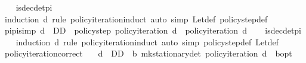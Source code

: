 \begin{isabellebody}
%
\isadelimproof
\ \ %
\endisadelimproof
%
\isatagproof
{}\isamarkupfalse%
\ is{\isacharunderscore}{\kern0pt}dec{\isacharunderscore}{\kern0pt}det{\isacharunderscore}{\kern0pt}pi\isanewline
\ \ \isamarkupfalse%
\ {\isacharparenleft}{\kern0pt}induction\ d\ rule{\isacharcolon}{\kern0pt}\ policy{\isacharunderscore}{\kern0pt}iteration{\isachardot}{\kern0pt}induct{\isacharparenright}{\kern0pt}\ {\isacharparenleft}{\kern0pt}auto\ simp{\isacharcolon}{\kern0pt}\ Let{\isacharunderscore}{\kern0pt}def\ policy{\isacharunderscore}{\kern0pt}step{\isacharunderscore}{\kern0pt}def{\isacharparenright}{\kern0pt}%
\endisatagproof
{\isafoldproof}%
%
\isadelimproof
\isanewline
%
\endisadelimproof
\isanewline
{}\isamarkupfalse%
\ pi{\isacharunderscore}{\kern0pt}pi{\isacharbrackleft}{\kern0pt}simp{\isacharbrackright}{\kern0pt}{\isacharcolon}{\kern0pt}\ {\isachardoublequoteopen}d\ {\isasymin}\ D\isactrlsub D\ {\isasymLongrightarrow}\ policy{\isacharunderscore}{\kern0pt}step\ {\isacharparenleft}{\kern0pt}policy{\isacharunderscore}{\kern0pt}iteration\ d{\isacharparenright}{\kern0pt}\ {\isacharequal}{\kern0pt}\ policy{\isacharunderscore}{\kern0pt}iteration\ d{\isachardoublequoteclose}\isanewline
%
\isadelimproof
\ \ %
\endisadelimproof
%
\isatagproof
{}\isamarkupfalse%
\ is{\isacharunderscore}{\kern0pt}dec{\isacharunderscore}{\kern0pt}det{\isacharunderscore}{\kern0pt}pi\isanewline
\ \ \isamarkupfalse%
\ {\isacharparenleft}{\kern0pt}induction\ d\ rule{\isacharcolon}{\kern0pt}\ policy{\isacharunderscore}{\kern0pt}iteration{\isachardot}{\kern0pt}induct{\isacharparenright}{\kern0pt}\ {\isacharparenleft}{\kern0pt}auto\ simp{\isacharcolon}{\kern0pt}\ policy{\isacharunderscore}{\kern0pt}step{\isacharunderscore}{\kern0pt}def\ Let{\isacharunderscore}{\kern0pt}def{\isacharparenright}{\kern0pt}%
\endisatagproof
{\isafoldproof}%
%
\isadelimproof
\isanewline
%
\endisadelimproof
\isanewline
{}\isamarkupfalse%
\ policy{\isacharunderscore}{\kern0pt}iteration{\isacharunderscore}{\kern0pt}correct{\isacharcolon}{\kern0pt}\ \isanewline
\ \ {\isachardoublequoteopen}d\ {\isasymin}\ D\isactrlsub D\ {\isasymLongrightarrow}\ {\isasymnu}\isactrlsub b\ {\isacharparenleft}{\kern0pt}mk{\isacharunderscore}{\kern0pt}stationary{\isacharunderscore}{\kern0pt}det\ {\isacharparenleft}{\kern0pt}policy{\isacharunderscore}{\kern0pt}iteration\ d{\isacharparenright}{\kern0pt}{\isacharparenright}{\kern0pt}\ {\isacharequal}{\kern0pt}\ {\isasymnu}\isactrlsub b{\isacharunderscore}{\kern0pt}opt{\isachardoublequoteclose}\ \isanewline
%

\end{isabellebody}
